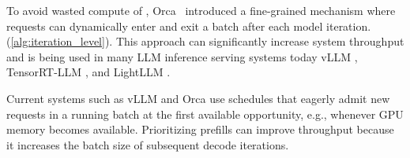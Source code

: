 To avoid wasted compute of \rls, Orca~\cite{orca} introduced a fine-grained \ils mechanism where requests can dynamically enter and exit a batch after each model iteration.(\autoref{alg:iteration_level}). 
This approach can significantly increase system throughput and is being used in many LLM inference serving systems today \eg vLLM \cite{vLLM:github}, TensorRT-LLM \cite{tensorrtllm:github}, and LightLLM \cite{lightllm:github}.

Current \ils systems such as vLLM \cite{vLLM:github} and Orca \cite{orca} use \prefillprio schedules that eagerly admit new requests in a running batch at the first available opportunity, e.g., whenever GPU memory becomes available. Prioritizing prefills can improve throughput because it increases the batch size of subsequent decode iterations.










